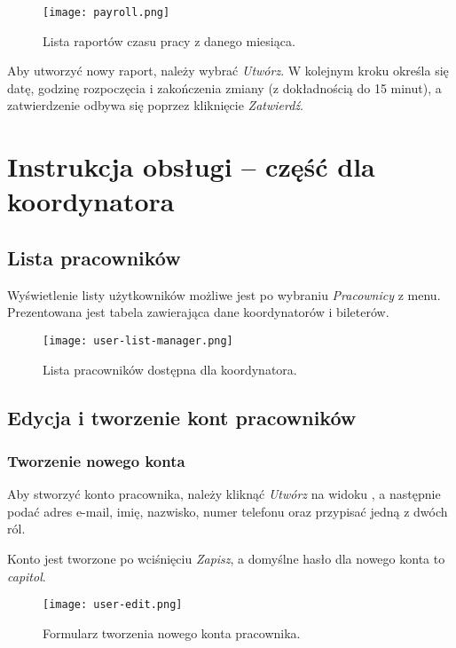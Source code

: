 \documentclass[shortabstract]{iithesis}
\begin{document}
\begin{figure}[H]
    \centering
    \texttt{[image: payroll.png]}
    \caption{Lista raportów czasu pracy z danego miesiąca.}
    \label{fig:payroll}
\end{figure}

Aby utworzyć nowy raport, należy wybrać \textit{Utwórz}. W kolejnym kroku określa się datę, godzinę rozpoczęcia i zakończenia zmiany (z dokładnością do 15 minut), a zatwierdzenie odbywa się poprzez kliknięcie \textit{Zatwierdź}.

\newpage


\section{Instrukcja obsługi – część dla koordynatora}

\subsection{Lista pracowników}
\label{user-list}

Wyświetlenie listy użytkowników możliwe jest po wybraniu \textit{Pracownicy} z menu. Prezentowana jest tabela zawierająca dane koordynatorów i bileterów.

\begin{figure}[H]
    \centering
    \texttt{[image: user-list-manager.png]}
    \caption{Lista pracowników dostępna dla koordynatora.}
    \label{fig:user-list-manager}
\end{figure}

\subsection{Edycja i tworzenie kont pracowników}

\subsubsection{Tworzenie nowego konta}

Aby stworzyć konto pracownika, należy kliknąć \textit{Utwórz} na widoku , a następnie podać adres e-mail, imię, nazwisko, numer telefonu oraz przypisać jedną z dwóch ról.

Konto jest tworzone po wciśnięciu \textit{Zapisz}, a domyślne hasło dla nowego konta to \textit{capitol}.

\begin{figure}[H]
    \centering
    \texttt{[image: user-edit.png]}
    \caption{Formularz tworzenia nowego konta pracownika.}
    \label{fig:user-edit}
\end{figure}
\end{document}

